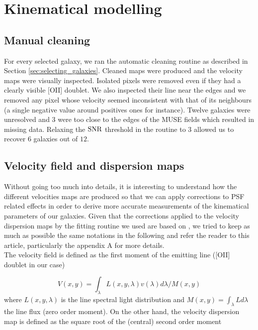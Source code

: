 \clearpage
\section{Kinematical modelling}
\label{sec:kinematical_modelling}

\subsection{Manual cleaning}
\label{sec:manual_cleaning}

For every selected galaxy, we ran the automatic cleaning routine as described in Section \ref{sec:selecting_galaxies}. Cleaned maps were produced and the velocity maps were visually inspected. Isolated pixels were removed even if they had a clearly visible [OII] doublet. We also inspected their line near the edges and we removed any pixel whose velocity seemed inconsistent with that of its neighbours (a single negative value around positives ones for instance). Twelve galaxies were unresolved and $3$ were too close to the edges of the MUSE fields which resulted in missing data. Relaxing the $\rm{SNR}$ threshold in the routine to $3$ allowed us to recover $6$ galaxies out of $12$. 

\subsection{Velocity field and dispersion maps}
\label{sec:vel_field_and_disp_map}

Without going too much into details, it is interesting to understand how the different velocities maps are produced so that we can apply corrections to PSF related effects in order to derive more accurate measurements of the kinematical parameters of our galaxies. Given that the corrections applied to the velocity dispersion maps by the fitting routine we used are based on , we tried to keep as much as possible the same notations in the following and refer the reader to this article, particularly the appendix A for more details. \\

The velocity field is defined as the first moment of the emitting line ([OII] doublet in our case)

\begin{equation}
	V(x,y) = \int_\lambda L(x,y,\lambda) v(\lambda) d\lambda / M(x, y)
	\label{eq:vel_field_def}
\end{equation}
where $L(x, y, \lambda)$ is the line spectral light distribution and $M(x,y) = \int_\lambda L d\lambda$ the line flux (zero order moment). On the other hand, the velocity dispersion map is defined as the square root of the (central) second order moment

